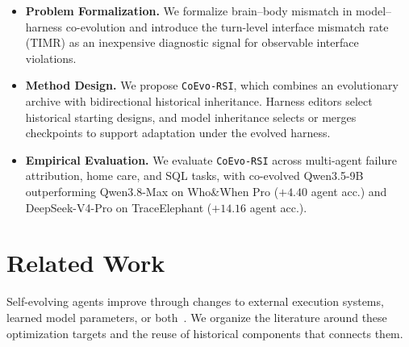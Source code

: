 \documentclass[11pt,a4paper]{article}
\newcommand{\ourmethod}{\texttt{CoEvo-RSI}}
\begin{document}
\begin{itemize}[leftmargin=*, itemsep=0pt, parsep=0pt]
    \item \textbf{Problem Formalization.}
    We formalize brain--body mismatch in model--harness co-evolution and introduce the turn-level interface mismatch rate (TIMR) as an inexpensive diagnostic signal for observable interface violations.
    \item \textbf{Method Design.}
    We propose \ourmethod{}, which combines an evolutionary archive with bidirectional historical inheritance. Harness editors select historical starting designs, and model inheritance selects or merges checkpoints to support adaptation under the evolved harness.
    \item \textbf{Empirical Evaluation.}
    We evaluate \ourmethod{} across multi-agent failure attribution, home care, and SQL tasks, with co-evolved Qwen3.5-9B outperforming Qwen3.8-Max on Who\&When Pro ($+4.40$ agent acc.) and DeepSeek-V4-Pro on TraceElephant ($+14.16$ agent acc.).
\end{itemize}

\section{Related Work}

Self-evolving agents improve through changes to external execution systems, learned model parameters, or both~\citep{gao2025selfevolving,guo2026harnesssurvey,wang2026diving}. We organize the literature around these optimization targets and the reuse of historical components that connects them.
\end{document}
